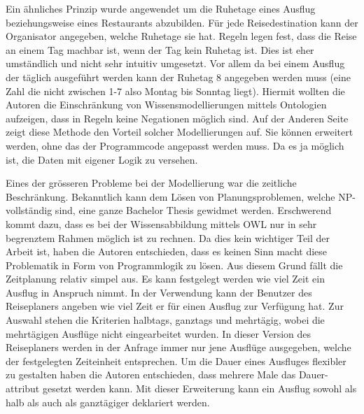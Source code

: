 Ein ähnliches Prinzip wurde angewendet um die Ruhetage eines Ausflug beziehungsweise eines Restaurants abzubilden. Für jede Reisedestination kann der Organisator angegeben, welche Ruhetage sie hat. Regeln legen fest, dass die Reise an einem Tag machbar ist, wenn der Tag kein Ruhetag ist. Dies ist eher umständlich und nicht sehr intuitiv umgesetzt. Vor allem da bei einem Ausflug der täglich ausgeführt werden kann der Ruhetag 8 angegeben werden muss (eine Zahl die nicht zwischen 1-7 also Montag bis Sonntag liegt). Hiermit wollten die Autoren die Einschränkung von Wissensmodellierungen mittels Ontologien aufzeigen, dass in Regeln keine Negationen möglich sind. Auf der Anderen Seite zeigt diese Methode den Vorteil solcher Modellierungen auf. Sie können erweitert werden, ohne das der Programmcode angepasst werden muss. Da es ja möglich ist, die Daten mit eigener Logik zu versehen. 

Eines der grösseren Probleme bei der Modellierung war die zeitliche Beschränkung. Bekanntlich kann dem Lösen von Planungsproblemen, welche NP-vollständig sind, eine ganze Bachelor Thesis gewidmet werden. Erschwerend kommt dazu, dass es bei der Wissensabbildung mittels OWL nur in sehr begrenztem Rahmen möglich ist zu rechnen. Da dies kein wichtiger Teil der Arbeit ist, haben die Autoren entschieden, dass es keinen Sinn macht diese Problematik in Form von Programmlogik zu lösen. Aus diesem Grund fällt die Zeitplanung relativ simpel aus. Es kann festgelegt werden wie viel Zeit ein Ausflug in Anspruch nimmt. In der Verwendung kann der Benutzer des Reiseplaners angeben wie viel Zeit er für einen Ausflug zur Verfügung hat. Zur Auswahl stehen die Kriterien halbtags, ganztags und mehrtägig, wobei die mehrtägigen Ausflüge nicht eingearbeitet wurden. In dieser Version des Reiseplaners werden in der Anfrage immer nur jene Ausflüge ausgegeben, welche der festgelegten Zeiteinheit entsprechen. Um die Dauer eines Ausfluges flexibler zu gestalten haben die Autoren entschieden, dass mehrere Male das Dauer-attribut gesetzt werden kann. Mit dieser Erweiterung kann ein Ausflug sowohl als halb als auch als ganztägiger deklariert werden.

